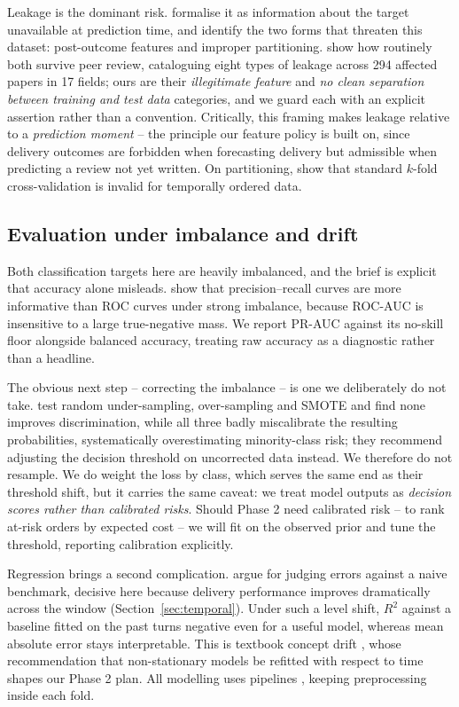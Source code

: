 Leakage is the dominant risk. \citet{kaufman2012leakage} formalise it as
information about the target unavailable at prediction time, and identify the two
forms that threaten this dataset: post-outcome features and improper partitioning.
\citet{kapoor2023leakage} show how routinely both survive peer review, cataloguing
eight types of leakage across 294 affected papers in 17 fields; ours are their
\emph{illegitimate feature} and \emph{no clean separation between training and
test data} categories, and we guard each with an explicit assertion rather than a
convention. Critically, this framing makes leakage relative to a \emph{prediction
moment} -- the principle our feature policy is built on, since delivery outcomes
are forbidden when forecasting delivery but admissible when predicting a review
not yet written. On partitioning, \citet{bergmeir2012cv} show that standard
$k$-fold cross-validation is invalid for temporally ordered data.

\subsection{Evaluation under imbalance and drift}

Both classification targets here are heavily imbalanced, and the brief is explicit
that accuracy alone misleads. \citet{saito2015prplot} show that precision--recall
curves are more informative than ROC curves under strong imbalance, because
ROC-AUC is insensitive to a large true-negative mass. We report PR-AUC against its
no-skill floor alongside balanced accuracy, treating raw accuracy as a diagnostic
rather than a headline.

The obvious next step -- correcting the imbalance -- is one we deliberately do not
take. \citet{goorbergh2022imbalance} test random under-sampling, over-sampling and
SMOTE \citep{chawla2002smote} and find none improves discrimination, while all
three badly miscalibrate the resulting probabilities, systematically
overestimating minority-class risk; they recommend adjusting the decision
threshold on uncorrected data instead. We therefore do not resample. We do weight
the loss by class, which serves the same end as their threshold shift, but it
carries the same caveat: we treat model outputs as \emph{decision scores rather
than calibrated risks}. Should Phase 2 need calibrated risk -- to rank at-risk
orders by expected cost -- we will fit on the observed prior and tune the
threshold, reporting calibration explicitly.

Regression brings a second complication. \citet{hyndman2006accuracy} argue for
judging errors against a naive benchmark, decisive here because delivery
performance improves dramatically across the window (Section~\ref{sec:temporal}).
Under such a level shift, $R^2$ against a baseline fitted on the past turns
negative even for a useful model, whereas mean absolute error stays interpretable.
This is textbook concept drift \citep{gama2014drift}, whose recommendation that
non-stationary models be refitted with respect to time shapes our Phase 2 plan.
All modelling uses  pipelines \citep{pedregosa2011sklearn},
keeping preprocessing inside each fold.


